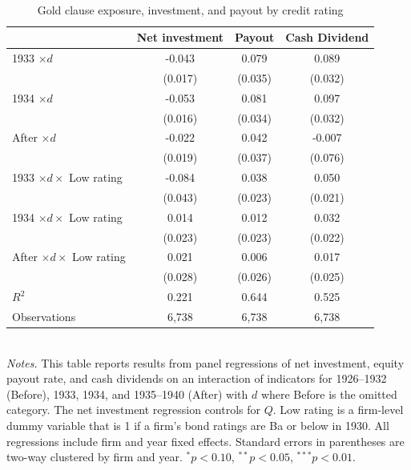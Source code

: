 \begin{table}[p]\centering
\caption{\\ Gold clause exposure, investment, and payout by credit rating} \footnotesize 
\label{tab:rating}
\renewcommand{\arraystretch}{1.2}
\begin{tabular}{lccc}
\toprule
 & Net investment & Payout & Cash Dividend \\
\midrule
1933 $\times d$                  & -0.043\sym{**} & 0.079\sym{**} & 0.089\sym{**} \\
                                 & (0.017)        & (0.035)       & (0.032)       \\
1934 $\times d$                  & -0.053\sym{***}& 0.081\sym{**} & 0.097\sym{**} \\
                                 & (0.016)        & (0.034)       & (0.032)       \\
After $\times d$                 & -0.022         & 0.042         & -0.007        \\
                                 & (0.019)        & (0.037)       & (0.076)       \\
1933 $\times d \times$ Low rating& -0.084\sym{*}  & 0.038         & 0.050\sym{**} \\
                                 & (0.043)        & (0.023)       & (0.021)       \\
1934 $\times d \times$ Low rating& 0.014          & 0.012         & 0.032         \\
                                 & (0.023)        & (0.023)       & (0.022)       \\
After $\times d \times$ Low rating& 0.021         & 0.006         & 0.017         \\
                                 & (0.028)        & (0.026)       & (0.025)       \\
\midrule
$R^2$                            & 0.221          & 0.644         & 0.525         \\
Observations                     & 6{,}738        & 6{,}738       & 6{,}738       \\
\bottomrule
\end{tabular} \\

\vspace*{3mm} \justifying \noindent
\footnotesize{\textit{Notes.} This table reports results from panel regressions of net investment, equity payout rate, and cash dividends on an interaction of indicators for 1926--1932 (Before), 1933, 1934, and 1935--1940 (After) with $d$ where Before is the omitted category. The net investment regression controls for $Q$. Low rating is a firm-level dummy variable that is 1 if a firm's bond ratings are Ba or below in 1930. All regressions include firm and year fixed effects. Standard errors in parentheses are two-way clustered by firm and year. $^{*}p<0.10$, $^{**}p<0.05$, $^{***}p<0.01$.}
\end{table}